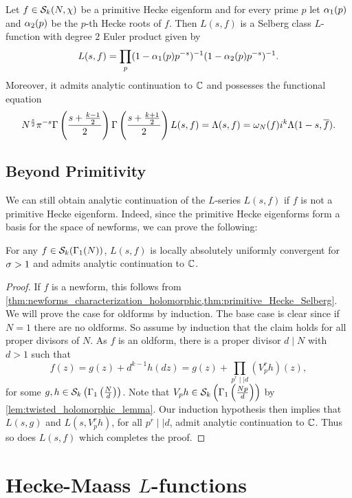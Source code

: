       \begin{theorem}\label{thm:primitive_Hecke_Selberg}
        Let $f \in \mathcal{S}_{k}(N,\chi)$ be a primitive Hecke eigenform and for every prime $p$ let $\alpha_{1}(p)$ and $\alpha_{2}(p)$ be the $p$-th Hecke roots of $f$. Then $L(s,f)$ is a Selberg class $L$-function with degree $2$ Euler product given by 
        \[
          L(s,f) = \prod_{p}(1-\alpha_{1}(p)p^{-s})^{-1}(1-\alpha_{2}(p)p^{-s})^{-1}.
        \]
        Moreover, it admits analytic continuation to $\mathbb{C}$ and possesses the functional equation
        \[
          N^{\frac{s}{2}}\pi^{-s}\Gamma\left(\frac{s+\frac{k-1}{2}}{2}\right)\Gamma\left(\frac{s+\frac{k+1}{2}}{2}\right)L(s,f) = \Lambda(s,f) = \omega_{N}(f)i^{k}\Lambda(1-s,\overline{f}).
        \]
      \end{theorem}
    \subsection*{Beyond Primitivity}
      We can still obtain analytic continuation of the $L$-series $L(s,f)$ if $f$ is not a primitive Hecke eigenform. Indeed, since the primitive Hecke eigenforms form a basis for the space of newforms, we can prove the following:

      \begin{theorem}\label{thm:analytic_continuation_Hecke}
        For any $f \in \mathcal{S}_{k}(\Gamma_{1}(N))$, $L(s,f)$ is locally absolutely uniformly convergent for $\sigma > 1$ and admits analytic continuation to $\mathbb{C}$.
      \end{theorem}
      \begin{proof}
        If $f$ is a newform, this follows from \cref{thm:newforms_characterization_holomorphic,thm:primitive_Hecke_Selberg}. We will prove the case for oldforms by induction. The base case is clear since if $N = 1$ there are no oldforms. So assume by induction that the claim holds for all proper divisors of $N$. As $f$ is an oldform, there is a proper divisor $d \mid N$ with $d > 1$ such that
        \[
          f(z) = g(z)+d^{k-1}h(dz) = g(z)+\prod_{p^{r} \mid\mid d}(V_{p}^{r}h)(z),
        \]
        for some $g,h \in \mathcal{S}_{k}\left(\Gamma_{1}\left(\frac{N}{d}\right)\right)$. Note that $V_{p}h \in \mathcal{S}_{k}\left(\Gamma_{1}\left(\frac{Np}{d}\right)\right)$ by \cref{lem:twisted_holomorphic_lemma}. Our induction hypothesis then implies that $L(s,g)$ and $L(s,V_{p}^{r}h)$, for all $p^{r} \mid\mid d$, admit analytic continuation to $\mathbb{C}$. Thus so does $L(s,f)$ which completes the proof.
      \end{proof}
  \section{Hecke-Maass \texorpdfstring{$L$}{L}-functions}
